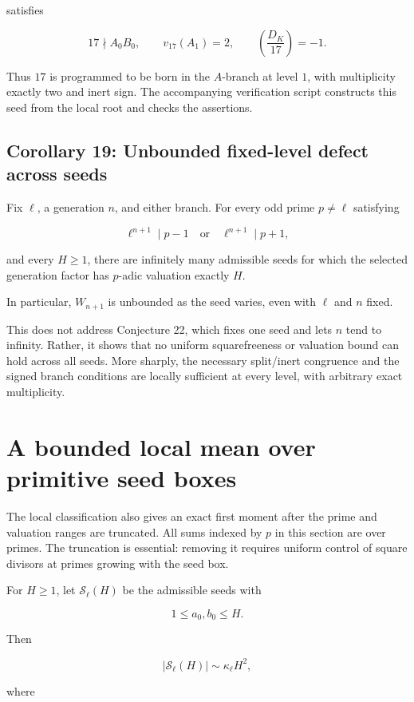 \documentclass[11pt]{article}
\begin{document}
satisfies

\[
17\nmid A_0B_0,
\qquad
v_{17}(A_1)=2,
\qquad
\left(\frac{D_K}{17}\right)=-1.
\]

Thus \(17\) is programmed to be born in the \(A\)-branch at level \(1\),
with multiplicity exactly two and inert sign. The accompanying verification
script constructs this seed from the local root and checks the assertions.

\subsection{Corollary 19: Unbounded fixed-level defect across seeds}

Fix \(\ell\), a generation \(n\), and either branch. For every odd prime
\(p\ne\ell\) satisfying

\[
\ell^{n+1}\mid p-1
\quad\text{or}\quad
\ell^{n+1}\mid p+1,
\]

and every \(H\geq1\), there are infinitely many admissible seeds for which
the selected generation factor has \(p\)-adic valuation exactly \(H\).

In particular, \(W_{n+1}\) is unbounded as the seed varies, even with
\(\ell\) and \(n\) fixed.

This does not address Conjecture 22, which fixes one seed and lets \(n\)
tend to infinity. Rather, it shows that no uniform squarefreeness or
valuation bound can hold across all seeds. More sharply, the necessary
split/inert congruence and the signed branch conditions are locally
sufficient at every level, with arbitrary exact multiplicity.

\section{A bounded local mean over primitive seed boxes}

The local classification also gives an exact first moment after the prime
and valuation ranges are truncated. All sums indexed by \(p\) in this
section are over primes. The truncation is essential: removing it requires
uniform control of square divisors at primes growing with the seed box.

For \(H\geq1\), let \(\mathcal S_\ell(H)\) be the admissible seeds with

\[
1\leq a_0,b_0\leq H.
\]

Then

\[
|\mathcal S_\ell(H)|
\sim
\kappa_\ell H^2,
\]

where
\end{document}
